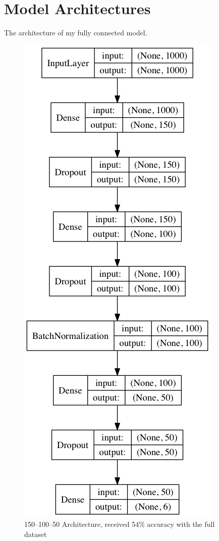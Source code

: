 \section{Model Architectures}
The architecture of my fully connected model.

\begin{figure}[h!]
    \centering
    \includegraphics[width=0.6\linewidth]{figures/dense_model.png}
    \caption{150--100--50 Architecture, received 54\% accuracy with the full dataset}
    \label{fig:dense_model}
\end{figure}



